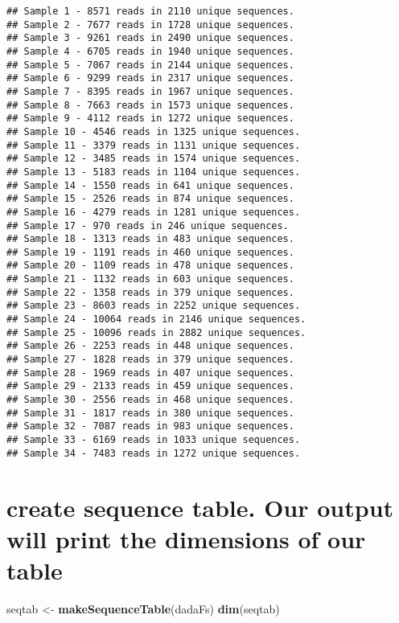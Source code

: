 \documentclass[
]{article}
\newenvironment{Shaded}{\begin{snugshade}}{\end{snugshade}}
\newcommand{\FunctionTok}[1]{\textcolor[rgb]{0.13,0.29,0.53}{\textbf{#1}}}
\newcommand{\NormalTok}[1]{#1}
\newcommand{\OtherTok}[1]{\textcolor[rgb]{0.56,0.35,0.01}{#1}}
\begin{document}
\begin{verbatim}
## Sample 1 - 8571 reads in 2110 unique sequences.
## Sample 2 - 7677 reads in 1728 unique sequences.
## Sample 3 - 9261 reads in 2490 unique sequences.
## Sample 4 - 6705 reads in 1940 unique sequences.
## Sample 5 - 7067 reads in 2144 unique sequences.
## Sample 6 - 9299 reads in 2317 unique sequences.
## Sample 7 - 8395 reads in 1967 unique sequences.
## Sample 8 - 7663 reads in 1573 unique sequences.
## Sample 9 - 4112 reads in 1272 unique sequences.
## Sample 10 - 4546 reads in 1325 unique sequences.
## Sample 11 - 3379 reads in 1131 unique sequences.
## Sample 12 - 3485 reads in 1574 unique sequences.
## Sample 13 - 5183 reads in 1104 unique sequences.
## Sample 14 - 1550 reads in 641 unique sequences.
## Sample 15 - 2526 reads in 874 unique sequences.
## Sample 16 - 4279 reads in 1281 unique sequences.
## Sample 17 - 970 reads in 246 unique sequences.
## Sample 18 - 1313 reads in 483 unique sequences.
## Sample 19 - 1191 reads in 460 unique sequences.
## Sample 20 - 1109 reads in 478 unique sequences.
## Sample 21 - 1132 reads in 603 unique sequences.
## Sample 22 - 1358 reads in 379 unique sequences.
## Sample 23 - 8603 reads in 2252 unique sequences.
## Sample 24 - 10064 reads in 2146 unique sequences.
## Sample 25 - 10096 reads in 2882 unique sequences.
## Sample 26 - 2253 reads in 448 unique sequences.
## Sample 27 - 1828 reads in 379 unique sequences.
## Sample 28 - 1969 reads in 407 unique sequences.
## Sample 29 - 2133 reads in 459 unique sequences.
## Sample 30 - 2556 reads in 468 unique sequences.
## Sample 31 - 1817 reads in 380 unique sequences.
## Sample 32 - 7087 reads in 983 unique sequences.
## Sample 33 - 6169 reads in 1033 unique sequences.
## Sample 34 - 7483 reads in 1272 unique sequences.
\end{verbatim}

\hypertarget{create-sequence-table.-our-output-will-print-the-dimensions-of-our-table}{%
\section{create sequence table. Our output will print the dimensions of
our
table}\label{create-sequence-table.-our-output-will-print-the-dimensions-of-our-table}}

\begin{Shaded}
\begin{Highlighting}[]
\NormalTok{seqtab }\OtherTok{\textless{}{-}} \FunctionTok{makeSequenceTable}\NormalTok{(dadaFs)}
\FunctionTok{dim}\NormalTok{(seqtab)}
\end{Highlighting}
\end{Shaded}
\end{document}
